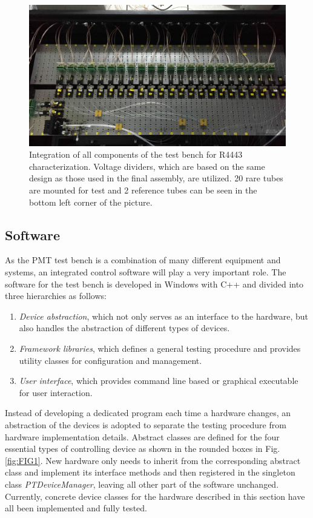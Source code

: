 \documentclass[preprint, times]{elsarticle}
\begin{document}
\begin{figure}
 \centering
 \includegraphics[width=125mm]{FIG7}
\caption{Integration of all components of the test bench for R4443 characterization.
Voltage dividers, which are based on the same design as those used in the final assembly, are utilized. 
20 rare tubes are mounted for test and 2 reference tubes can be seen in the bottom left corner of the picture. 
}
\label{fig:FIG7}
\end{figure}

\subsection{Software}
\label{sec:software}

As the PMT test bench is a combination of many different equipment and systems, an integrated control software will play a very important role. The software for the test bench is developed in Windows with C++ and divided into three hierarchies as follows:
\begin{enumerate}
 \item \textit{Device abstraction}, which not only serves as an interface to the hardware, but also handles the abstraction of different types of devices. 
 \item \textit{Framework libraries}, which defines a general testing procedure and provides utility classes for configuration and management.
 \item \textit{User interface}, which provides command line based or graphical executable for user interaction. 
\end{enumerate}

Instead of developing a dedicated program each time a hardware changes, an abstraction of the devices is adopted to separate the testing procedure from hardware implementation details. 
Abstract classes are defined for the four essential types of controlling device as shown in the rounded boxes in Fig.\ref{fig:FIG1}.
New hardware only needs to inherit from the corresponding abstract class and implement its interface methods and then registered in the singleton class \textit{PTDeviceManager}, leaving all other part of the software unchanged.
Currently, concrete device classes for the hardware described in this section have all been implemented and fully tested.
\end{document}
